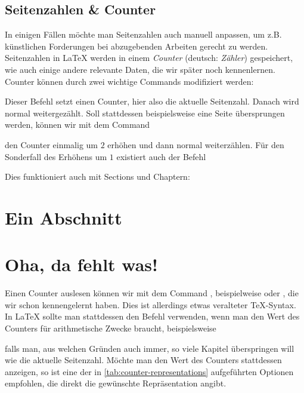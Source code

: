\subsection{Seitenzahlen \& Counter}\label{sec:pages-and-counters}
In einigen Fällen möchte man Seitenzahlen auch manuell anpassen, um z.B. künstlichen Forderungen bei abzugebenden Arbeiten gerecht zu werden.
Seitenzahlen in \LaTeX{} werden in einem \emph{Counter} (deutsch: \emph{Zähler}) gespeichert, wie auch einige andere relevante Daten, die wir später noch kennenlernen.
Counter können durch zwei wichtige Commands modifiziert werden:
\begin{latexlisting}
	\setcounter{page}{3}
\end{latexlisting}
Dieser Befehl setzt einen Counter, hier also die aktuelle Seitenzahl.
Danach wird normal weitergezählt.
Soll stattdessen beispielsweise eine Seite übersprungen werden, können wir mit dem Command
\begin{latexlisting}
	\addtocounter{page}{2}
\end{latexlisting}
den Counter einmalig um $2$ erhöhen und dann normal weiterzählen.
Für den Sonderfall des Erhöhens um $1$ existiert auch der Befehl
\begin{latexlisting}
\end{latexlisting}
Dies funktioniert auch mit Sections und Chaptern:
\begin{latexlisting}
	\section{Ein Abschnitt}
	\addtocounter{section}{1}
	\section{Oha, da fehlt was!}
\end{latexlisting}
Einen Counter auslesen können wir mit dem Command , beispielweise  oder , die wir schon kennengelernt haben.
Dies ist allerdings etwas veralteter \TeX -Syntax.
In \LaTeX{} sollte man stattdessen den Befehl  verwenden, wenn man den Wert des Counters für arithmetische Zwecke braucht, beispielsweise
\begin{latexlisting}
	\addtocounter{section}{\value{page}}
\end{latexlisting}
falls man, aus welchen Gründen auch immer, so viele Kapitel überspringen will wie die aktuelle Seitenzahl.
Möchte man den Wert des Counters stattdessen anzeigen, so ist eine der in \ref{tab:counter-representations} aufgeführten Optionen empfohlen, die direkt die gewünschte Repräsentation angibt.

